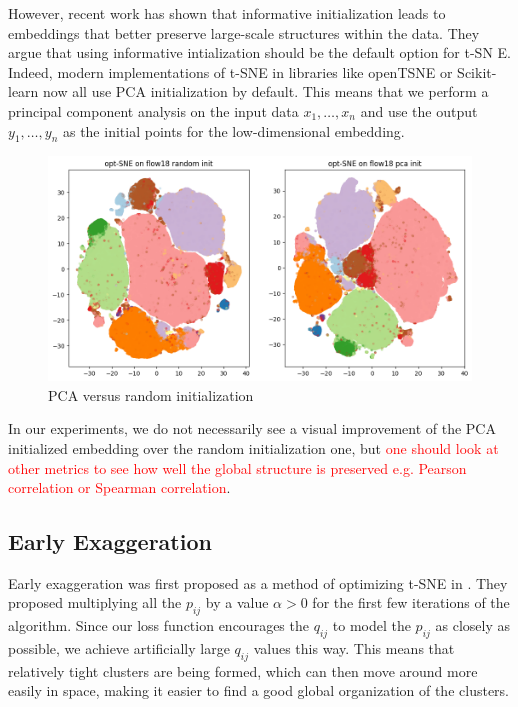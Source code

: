 However, recent work \cite{kobak21} has shown that informative initialization leads to embeddings that better preserve large-scale structures within the data. 
They argue that using informative intialization should be the default option for t-SN
E.
Indeed, modern implementations of t-SNE in libraries like openTSNE \cite{openTSNE} or Scikit-learn now all use PCA initialization by default. 
This means that we perform a principal component analysis on the input data $x_1, \dots, x_n$ and use the output $y_1, \dots, y_n$ as the initial points for the low-dimensional embedding. 

\begin{figure}[h]
    \centering 
    \includegraphics[width=\linewidth]{figures/pca_vs_random_init.png}
    \caption{PCA versus random initialization}
    \label{fig:PCA_vs_random}
\end{figure}
In our experiments, we do not necessarily see a visual improvement of the PCA initialized embedding over the random initialization one, but \textcolor{red}{one should look at other metrics to see how well the global structure is preserved e.g. Pearson correlation or Spearman correlation}. 

\subsection{Early Exaggeration}
Early exaggeration was first proposed as a method of optimizing t-SNE in \cite{vdMaa08}. They proposed multiplying all the $p_{ij}$ by a value $\alpha > 0$ for the first few iterations of the algorithm. Since our loss function encourages the $q_{ij}$ to model the $p_{ij}$ as closely as possible, we achieve artificially large $q_{ij}$ values this way. This means that relatively tight clusters are being formed, which can then move around more easily in space, making it easier to find a good global organization of the clusters. 

